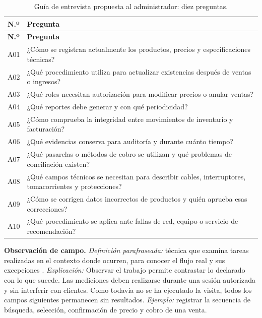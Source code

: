 \documentclass[onecolumn,12pt,a4paper]{IEEEtran}
\begin{document}
\begin{longtable}{@{}p{1.0cm}p{14.3cm}@{}}
\caption{Guía de entrevista propuesta al administrador: diez preguntas.}\label{tab:administrador}\\
\toprule\textbf{N.º} & \textbf{Pregunta}\\\midrule\endfirsthead
\toprule\textbf{N.º} & \textbf{Pregunta}\\\midrule\endhead
A01 & ¿Cómo se registran actualmente los productos, precios y especificaciones técnicas?\\
A02 & ¿Qué procedimiento utiliza para actualizar existencias después de ventas o ingresos?\\
A03 & ¿Qué roles necesitan autorización para modificar precios o anular ventas?\\
A04 & ¿Qué reportes debe generar y con qué periodicidad?\\
A05 & ¿Cómo comprueba la integridad entre movimientos de inventario y facturación?\\
A06 & ¿Qué evidencias conserva para auditoría y durante cuánto tiempo?\\
A07 & ¿Qué pasarelas o métodos de cobro se utilizan y qué problemas de conciliación existen?\\
A08 & ¿Qué campos técnicos se necesitan para describir cables, interruptores, tomacorrientes y protecciones?\\
A09 & ¿Cómo se corrigen datos incorrectos de productos y quién aprueba esas correcciones?\\
A10 & ¿Qué procedimiento se aplica ante fallas de red, equipo o servicio de recomendación?\\
\bottomrule\end{longtable}
\normalsize

\textbf{Observación de campo.} \emph{Definición parafraseada:} técnica que examina tareas realizadas en el contexto donde ocurren, para conocer el flujo real y sus excepciones \cite{ireb2023,wiegers2013}. \emph{Explicación:} Observar el trabajo permite contrastar lo declarado con lo que sucede. Las mediciones deben realizarse durante una sesión autorizada y sin interferir con clientes. Como todavía no se ha ejecutado la visita, todos los campos siguientes permanecen sin resultados. \emph{Ejemplo:} registrar la secuencia de búsqueda, selección, confirmación de precio y cobro de una venta.
\end{document}
